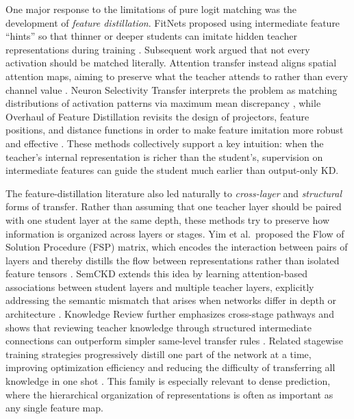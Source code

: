 One major response to the limitations of pure logit matching was the development of \emph{feature distillation}. FitNets proposed using intermediate feature ``hints'' so that thinner or deeper students can imitate hidden teacher representations during training \cite{romero2015fitnets}. Subsequent work argued that not every activation should be matched literally. Attention transfer instead aligns spatial attention maps, aiming to preserve what the teacher attends to rather than every channel value \cite{zagoruyko2017paying}. Neuron Selectivity Transfer interprets the problem as matching distributions of activation patterns via maximum mean discrepancy \cite{huang2017nst}, while Overhaul of Feature Distillation revisits the design of projectors, feature positions, and distance functions in order to make feature imitation more robust and effective \cite{heo2019ofd}. These methods collectively support a key intuition: when the teacher's internal representation is richer than the student's, supervision on intermediate features can guide the student much earlier than output-only KD.

The feature-distillation literature also led naturally to \emph{cross-layer} and \emph{structural} forms of transfer. Rather than assuming that one teacher layer should be paired with one student layer at the same depth, these methods try to preserve how information is organized across layers or stages. Yim et al.\ proposed the Flow of Solution Procedure (FSP) matrix, which encodes the interaction between pairs of layers and thereby distills the flow between representations rather than isolated feature tensors \cite{yim2017fsp}. SemCKD extends this idea by learning attention-based associations between student layers and multiple teacher layers, explicitly addressing the semantic mismatch that arises when networks differ in depth or architecture \cite{chen2021semckd}. Knowledge Review further emphasizes cross-stage pathways and shows that reviewing teacher knowledge through structured intermediate connections can outperform simpler same-level transfer rules \cite{chen2021reviewkd}. Related stagewise training strategies progressively distill one part of the network at a time, improving optimization efficiency and reducing the difficulty of transferring all knowledge in one shot \cite{kulkarni2020skd}. This family is especially relevant to dense prediction, where the hierarchical organization of representations is often as important as any single feature map.

